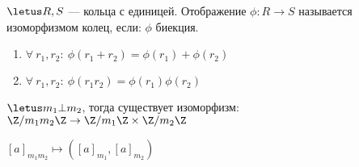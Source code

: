\begin{defn}
    $\letus R, S$ --- кольца с единицей. Отображение $\phi: R \to S$ называется изоморфизмом колец, если: $\phi$ биекция.
    
    \begin{enumerate}
        \item $\forall\ r_1, r_2:\ \phi(r_1 + r_2) = \phi(r_1) + \phi(r_2)$
        
        \item $\forall\ r_1, r_2:\ \phi(r_1 r_2) = \phi(r_1) \phi(r_2)$
    \end{enumerate}
\end{defn}

\begin{theorem-non}
    $\letus m_1 \bot m_2$, тогда существует изоморфизм: $\Z/m_1m_2\Z \to \Z/m_1\Z \times \Z/m_2\Z$
    
    $[a]_{m_1m_2} \mapsto ([a]_{m_1}, [a]_{m_2})$
\end{theorem-non}

